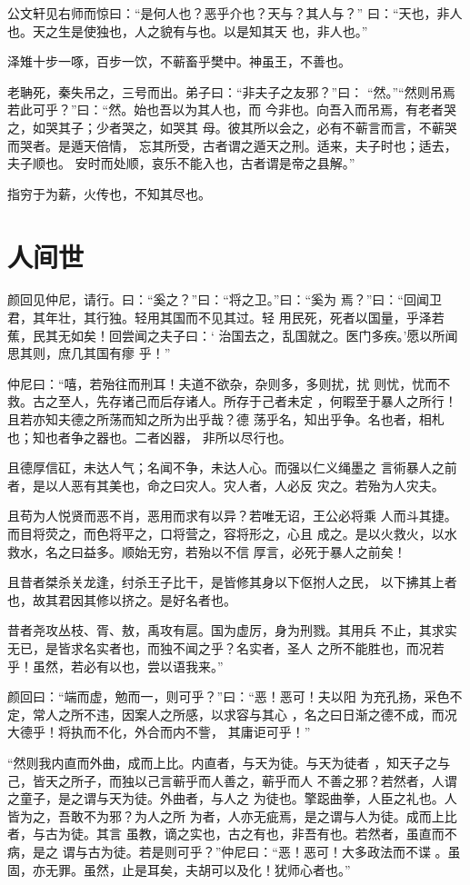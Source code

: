 \documentclass[a4paper,12pt,UTF8,twoside]{ctexbook}
\begin{document}
公文轩见右师而惊曰：“是何人也？恶乎介也？天与？其人与？” 曰：“天也，非人也。天之生是使独也，人之貌有与也。以是知其天 也，非人也。”

泽雉十步一啄，百步一饮，不蕲畜乎樊中。神虽王，不善也。

老聃死，秦失吊之，三号而出。弟子曰：“非夫子之友邪？”曰： “然。”“然则吊焉若此可乎？”曰：“然。始也吾以为其人也，而 今非也。向吾入而吊焉，有老者哭之，如哭其子；少者哭之，如哭其 母。彼其所以会之，必有不蕲言而言，不蕲哭而哭者。是遁天倍情， 忘其所受，古者谓之遁天之刑。适来，夫子时也；适去，夫子顺也。 安时而处顺，哀乐不能入也，古者谓是帝之县解。”

指穷于为薪，火传也，不知其尽也。

\section{人间世}

颜回见仲尼，请行。曰：“奚之？”曰：“将之卫。”曰：“奚为 焉？”曰：“回闻卫君，其年壮，其行独。轻用其国而不见其过。轻 用民死，死者以国量，乎泽若蕉，民其无如矣！回尝闻之夫子曰：‘ 治国去之，乱国就之。医门多疾。’愿以所闻思其则，庶几其国有瘳 乎！”

仲尼曰：“嘻，若殆往而刑耳！夫道不欲杂，杂则多，多则扰，扰 则忧，忧而不救。古之至人，先存诸己而后存诸人。所存于己者未定 ，何暇至于暴人之所行！且若亦知夫德之所荡而知之所为出乎哉？德 荡乎名，知出乎争。名也者，相札也；知也者争之器也。二者凶器， 非所以尽行也。

且德厚信矼，未达人气；名闻不争，未达人心。而强以仁义绳墨之 言術暴人之前者，是以人恶有其美也，命之曰灾人。灾人者，人必反 灾之。若殆为人灾夫。

且苟为人悦贤而恶不肖，恶用而求有以异？若唯无诏，王公必将乘 人而斗其捷。而目将荧之，而色将平之，口将营之，容将形之，心且 成之。是以火救火，以水救水，名之曰益多。顺始无穷，若殆以不信 厚言，必死于暴人之前矣！

且昔者桀杀关龙逢，纣杀王子比干，是皆修其身以下伛拊人之民， 以下拂其上者也，故其君因其修以挤之。是好名者也。

昔者尧攻丛枝、胥、敖，禹攻有扈。国为虚厉，身为刑戮。其用兵 不止，其求实无已，是皆求名实者也，而独不闻之乎？名实者，圣人 之所不能胜也，而况若乎！虽然，若必有以也，尝以语我来。”

颜回曰：“端而虚，勉而一，则可乎？”曰：“恶！恶可！夫以阳 为充孔扬，采色不定，常人之所不违，因案人之所感，以求容与其心 ，名之曰日渐之德不成，而况大德乎！将执而不化，外合而内不訾， 其庸讵可乎！”

“然则我内直而外曲，成而上比。内直者，与天为徒。与天为徒者 ，知天子之与己，皆天之所子，而独以己言蕲乎而人善之，蕲乎而人 不善之邪？若然者，人谓之童子，是之谓与天为徒。外曲者，与人之 为徒也。擎跽曲拳，人臣之礼也。人皆为之，吾敢不为邪？为人之所 为者，人亦无疵焉，是之谓与人为徒。成而上比者，与古为徒。其言 虽教，谪之实也，古之有也，非吾有也。若然者，虽直而不病，是之 谓与古为徒。若是则可乎？”仲尼曰：“恶！恶可！大多政法而不谍 。虽固，亦无罪。虽然，止是耳矣，夫胡可以及化！犹师心者也。”
\end{document}
